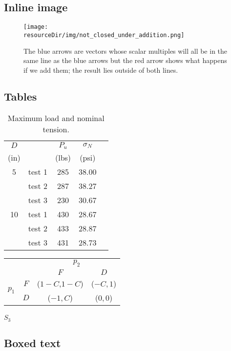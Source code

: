\documentclass[MathsNotesBase.tex]{subfiles}
\begin{document}
	\subsection{Inline image}
	\begin{figure}[h!]
		\texttt{[image: \\resourceDir/img/not\_closed\_under\_addition.png]}
		\caption{The blue arrows are vectors whose scalar multiples will all be in the same line as the blue arrows but the red arrow shows what happens if we add them; the result lies outside of both lines.}
		\label{fig:label-must-go-here}
	\end{figure}
	
	\subsection{Tables}
	\begin{table}[h!]%
		\caption{Maximum load and nominal tension.}
		\label{aggiungi}\centering%
		\begin{tabular}{clccc}
			\toprule%
			$D$ & & $P_u$ & $\sigma_N$ \\
			(in)& &(lbs) & (psi) \\ \toprule%
			5 & test 1 & 285 & 38.00 \\
			& test 2 & 287 & 38.27 \\
			& test 3 & 230 & 30.67 \\ \midrule
			10 & test 1 & 430 & 28.67 \\
			& test 2 & 433 & 28.87 \\
			& test 3 & 431 & 28.73 \\ \bottomrule
		\end{tabular}
	\end{table}
	
	\begin{tabular}[h!]{*4c}
		& &\multicolumn{2}{c}{$p_{2}$}\\
		& & $F$ &$D$ \\\cline{3-4}
		\multirow{2}{*}{$p_{1}$}& $F$ & \multicolumn{1}{|c|}{($1-C$,$1-C$)} & \multicolumn{1}{c|}{($-C,1$)} \\\cline{3-4}
		& $D$ & \multicolumn{1}{|c|}{($-1,C$)} &\multicolumn{1}{c|}{($0,0$)}\\\cline{3-4}
	\end{tabular}
	\subparagraph{$S_3$}
	
	\subsection{Boxed text}
	\noindent{}\bigskip
\end{document}
